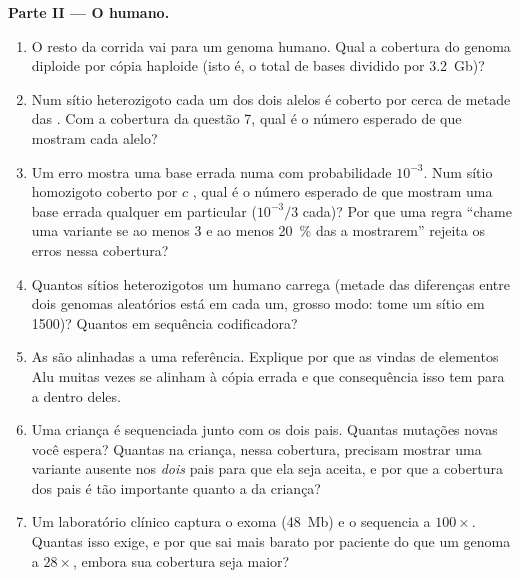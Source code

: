 \begin{problem}
\medskip
\noindent\textbf{Parte II --- O humano.}
\begin{enumerate}[resume]
  \item O resto da corrida vai para um genoma humano. Qual a cobertura
        do genoma diploide por cópia haploide (isto é, o total de bases
        dividido por \qty{3.2}{Gb})?
  \item Num sítio heterozigoto cada um dos dois alelos é coberto por
        cerca de metade das . Com a cobertura da questão 7,
        qual é o número esperado de  que mostram cada alelo?
  \item Um erro mostra uma base errada numa  com probabilidade
        $10^{-3}$. Num sítio homozigoto coberto por $c$ , qual
        é o número esperado de  que mostram uma base errada
        qualquer em particular ($10^{-3}/3$ cada)? Por que uma regra
        ``chame uma variante se ao menos $3$  e ao menos
        \qty{20}{\%} das  a mostrarem'' rejeita os erros nessa
        cobertura?
  \item Quantos sítios heterozigotos um humano carrega (metade das
        diferenças entre dois genomas aleatórios está em cada um,
        grosso modo: tome um sítio em \num{1500})? Quantos em sequência
        codificadora?
  \item As  são alinhadas a uma referência. Explique por que as
         vindas de elementos Alu muitas vezes se alinham à
        cópia errada e que consequência isso tem para a  dentro deles.
  \item Uma criança é sequenciada junto com os dois pais. Quantas
        mutações novas você espera? Quantas  na criança, nessa
        cobertura, precisam mostrar uma variante ausente nos
        \emph{dois} pais para que ela seja aceita, e por que a
        cobertura dos pais é tão importante quanto a da criança?
  \item Um laboratório clínico captura o exoma (\qty{48}{Mb}) e o
        sequencia a $100\times$. Quantas  isso exige, e por que
        sai mais barato por paciente do que um genoma a $28\times$,
        embora sua cobertura seja maior?
\end{enumerate}


\end{problem}
